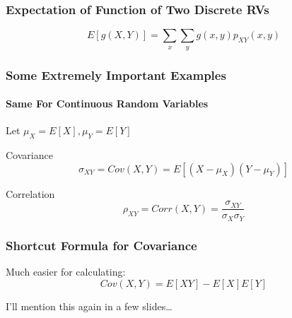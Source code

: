 \documentclass[handout]{beamer}
\begin{document}
\begin{frame}
\frametitle{Expectation of Function of Two Discrete RVs}
\Large
		$$\boxed{E[g(X,Y)] = \sum_x\sum_y g(x,y)p_{XY}(x,y)}$$
\end{frame}
\begin{frame}
\frametitle{Some Extremely Important Examples}
\framesubtitle{Same For Continuous Random Variables}
Let $\mu_X = E[X], \mu_Y = E[Y]$
\vspace{2em}

\begin{block}{Covariance}
$$\sigma_{XY} = Cov(X,Y) = E[(X-\mu_X)(Y - \mu_Y)]$$
\end{block}

\begin{block}{Correlation}
$$\rho_{XY} = Corr(X,Y) = \frac{\sigma_{XY}}{\sigma_X \sigma_Y}$$
\end{block}
\vspace{3em}
\end{frame}
\begin{frame}
\frametitle{Shortcut Formula for Covariance}

Much easier for calculating:
 $$\boxed{Cov(X,Y) = E[XY] - E[X]E[Y]}$$


\vspace{2em}
I'll mention this again in a few slides\dots
\end{frame}
\end{document}
